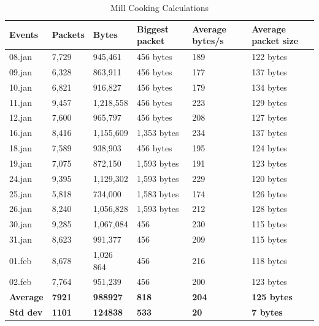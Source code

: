 \begin{table}[!ht]
    \centering
    \caption{Mill Cooking Calculations}
    \begin{tabular}{|l|l|l|l|l|l|}
    \hline
        \textbf{Events} & \textbf{Packets} & \textbf{Bytes} & \textbf{Biggest packet} & \textbf{Average bytes/s} & \textbf{Average packet size } \\ \hline
        08.jan & 7,729 & 945,461 & 456 bytes & 189 & 122 bytes \\ \hline
        09.jan & 6,328 & 863,911 & 456 bytes & 177 & 137 bytes \\ \hline
        10.jan & 6,821 & 916,827 & 456 bytes & 179 & 134 bytes \\ \hline
        11.jan & 9,457 & 1,218,558 & 456 bytes & 223 & 129 bytes \\ \hline
        12.jan & 7,600 & 965,797 & 456 bytes & 208 & 127 bytes \\ \hline
        16.jan & 8,416 & 1,155,609 & 1,353 bytes & 234 & 137 bytes \\ \hline
        18.jan & 7,589 & 938,903 & 456 bytes & 195 & 124 bytes \\ \hline
        19.jan & 7,075 & 872,150 & 1,593 bytes & 191 & 123 bytes \\ \hline
        24.jan & 9,395 & 1,129,302 & 1,593 bytes & 229 & 120 bytes \\ \hline
        25.jan & 5,818 & 734,000 & 1,583 bytes & 174 & 126 bytes \\ \hline
        26.jan & 8,240 & 1,056,828 & 1,593 bytes & 212 & 128 bytes \\ \hline
        30.jan & 9,285 & 1,067,084 & 456 & 230 & 115 bytes \\ \hline
        31.jan & 8,623 & 991,377 & 456 & 209 & 115 bytes \\ \hline
        01.feb & 8,678 & 1,026 864 & 456 & 216 & 118 bytes \\ \hline
        02.feb & 7,764 & 951,239 & 456 & 200 & 123 bytes \\ \hline
        \textbf{Average} & \textbf{7921} & \textbf{988927} & \textbf{818} & \textbf{204} & \textbf{125 bytes}  \\ \hline
        \textbf{Std dev} & \textbf{1101} & \textbf{124838} & \textbf{533} & \textbf{20} & \textbf{7 bytes}  \\ \hline
    \end{tabular}
    \label{tab:MillCookingCalculations}
\end{table}

